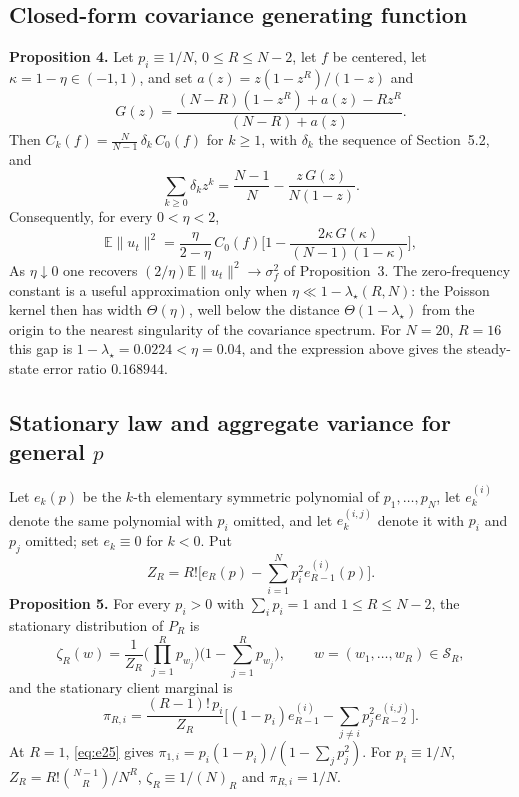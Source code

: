 \documentclass[twoside,11pt]{article}
\begin{document}
\subsection{Closed-form covariance generating function}
\textbf{Proposition 4.} Let $p_i\equiv1/N$, $0\leq R\leq N-2$, let $f$ be centered, let $\kappa=1-\eta\in(-1,1)$, and set $a(z)=z(1-z^{R})/(1-z)$ and
\begin{equation}\label{eq:e20}
G(z)=\dfrac{(N-R)(1-z^{R})+a(z)-R z^{R}}{(N-R)+a(z)} .
\end{equation}
Then $C_k(f)=\frac{N}{N-1}\,\delta_k\,C_0(f)$ for $k\geq1$, with $\delta_k$ the sequence of Section~5.2, and
\begin{equation}\label{eq:e21}
\sum_{k\geq0}\delta_k z^{k}=\dfrac{N-1}{N}-\dfrac{z\,G(z)}{N(1-z)} .
\end{equation}
Consequently, for every $0<\eta<2$,
\begin{equation}\label{eq:e22}
\mathbb{E}\|u_t\|^{2}=\dfrac{\eta}{2-\eta}\,C_0(f)\Big[1-\dfrac{2\kappa\,G(\kappa)}{(N-1)(1-\kappa)}\Big],
\end{equation}
As $\eta\downarrow0$ one recovers $(2/\eta)\mathbb{E}\|u_t\|^{2}\to\sigma_f^{2}$ of Proposition~3. The zero-frequency constant is a useful approximation only when $\eta\ll1-\lambda_\star(R,N)$: the Poisson kernel then has width $\Theta(\eta)$, well below the distance $\Theta(1-\lambda_\star)$ from the origin to the nearest singularity of the covariance spectrum. For $N=20$, $R=16$ this gap is $1-\lambda_\star=0.0224<\eta=0.04$, and the expression above gives the steady-state error ratio $0.168944$.

\subsection{\texorpdfstring{Stationary law and aggregate variance for general $p$}{Stationary law and aggregate variance for general p}}
Let $e_k(p)$ be the $k$-th elementary symmetric polynomial of
$p_1,\dots,p_N$, let $e_k^{(i)}$ denote the same polynomial with $p_i$
omitted, and let $e_k^{(i,j)}$ denote it with $p_i$ and $p_j$ omitted; set
$e_k\equiv0$ for $k<0$. Put
\begin{equation}\label{eq:e23}
Z_R=R!\Big[e_R(p)-\sum_{i=1}^{N}p_i^{2}e_{R-1}^{(i)}(p)\Big].
\end{equation}
\textbf{Proposition 5.} For every $p_i>0$ with $\sum_i p_i=1$ and
$1\leq R\leq N-2$, the stationary distribution of $P_R$ is
\begin{equation}\label{eq:e24}
\zeta_R(w)=\frac{1}{Z_R}\Big(\prod_{j=1}^{R}p_{w_j}\Big)\Big(1-\sum_{j=1}^{R}p_{w_j}\Big),\qquad w=(w_1,\dots,w_R)\in\mathcal{S}_R ,
\end{equation}
and the stationary client marginal is
\begin{equation}\label{eq:e25}
\pi_{R,i}=\frac{(R-1)!\,p_i}{Z_R}\Big[(1-p_i)e_{R-1}^{(i)}-\sum_{j\neq i}p_j^{2}e_{R-2}^{(i,j)}\Big].
\end{equation}
At $R=1$, \eqref{eq:e25} gives
$\pi_{1,i}=p_i(1-p_i)/(1-\sum_jp_j^2)$. For $p_i\equiv1/N$,
$Z_R=R!\binom{N-1}{R}/N^{R}$, $\zeta_R\equiv1/(N)_R$ and
$\pi_{R,i}=1/N$.
\end{document}
